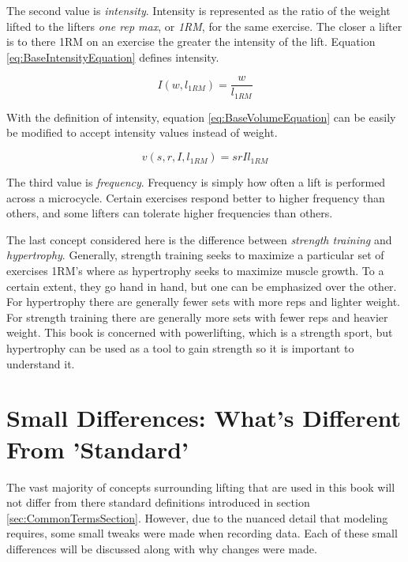 The second value is \textit{intensity}. Intensity is represented as the ratio of the weight lifted to the lifters \textit{one rep max}, or \textit{1RM}, for the same exercise. The closer a lifter is to there 1RM on an exercise the greater the intensity of the lift. Equation \ref{eq:BaseIntensityEquation} defines intensity.

\begin{equation}
    \label{eq:BaseIntensityEquation}
    I(w,l_{1RM})=\frac{w}{l_{1RM}}
\end{equation}

With the definition of intensity, equation \ref{eq:BaseVolumeEquation} can be easily be modified to accept intensity values instead of weight.

\begin{equation}
    \label{eq:IntensityBasedVolumeEquation}
    v(s,r,I,l_{1RM})=srIl_{1RM}
\end{equation}

The third value is \textit{frequency}. Frequency is simply how often a lift is performed across a microcycle. Certain exercises respond better to higher frequency than others, and some lifters can tolerate higher frequencies than others.

The last concept considered here is the difference between \textit{strength training} and \textit{hypertrophy}. Generally, strength training seeks to maximize a particular set of exercises 1RM's where as hypertrophy seeks to maximize muscle growth. To a certain extent, they go hand in hand, but one can be emphasized over the other. For hypertrophy there are generally fewer sets with more reps and lighter weight. For strength training there are generally more sets with fewer reps and heavier weight. This book is concerned with powerlifting, which is a strength sport, but hypertrophy can be used as a tool to gain strength so it is important to understand it.


\section{Small Differences: What's Different From 'Standard'}
\label{sec:SmallDifferencesSection}

The vast majority of concepts surrounding lifting that are used in this book will not differ from there standard definitions introduced in section \ref{sec:CommonTermsSection}. However, due to the nuanced detail that modeling requires, some small tweaks were made when recording data. Each of these small differences will be discussed along with why changes were made.

